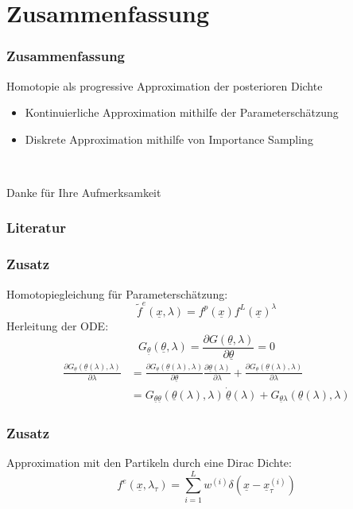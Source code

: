\documentclass[18pt]{beamer}
\begin{document}
\section{Zusammenfassung}
\begin{frame}
    \frametitle{Zusammenfassung}
    Homotopie als progressive Approximation der posterioren Dichte
    \begin{itemize}
        \item Kontinuierliche Approximation mithilfe der Parameterschätzung
        \item Diskrete Approximation mithilfe von Importance Sampling
    \end{itemize}
\end{frame}

\begin{frame}{~}
	\begin{center}
		\huge{Danke für Ihre Aufmerksamkeit}
	\end{center}
\end{frame}

\begin{frame}
    \frametitle{Literatur}
    
    
\end{frame}

\begin{frame}
    \frametitle{Zusatz}
    Homotopiegleichung für Parameterschätzung:
    \begin{equation}
        \tilde{f}^{e}(\underline{x},\lambda) = f^p(\underline{x})f^L(\underline{x})^{\lambda}
    \end{equation}
    Herleitung der ODE:
    \begin{equation}
        G_{\underline{\theta}}(\underline{\theta}, \lambda) = \frac{\partial G(\underline{\theta}, \lambda)}{\partial \underline{\theta}} = 0 
    \end{equation}
    \begin{equation}
        \begin{split}
            \frac{\partial G_{\underline{\theta}}(\underline{\theta}(\lambda),\lambda)}{\partial \lambda} &= \frac{\partial G_{\underline{\theta}}(\underline{\theta}(\lambda),\lambda)}{\partial \underline{\theta}} \frac{\partial \underline{\theta}(\lambda)}{\partial \lambda} + \frac{\partial G_{\underline{\theta}}(\underline{\theta}(\lambda),\lambda)}{\partial \lambda} \\
            &= G_{\underline{\theta}\underline{\theta}}(\underline{\theta}(\lambda),\lambda) \, \underline{\dot{\theta}}(\lambda) + G_{\underline{\theta}\lambda}(\underline{\theta}(\lambda),\lambda) 
        \end{split}
    \end{equation}
\end{frame}

\begin{frame}
    \frametitle{Zusatz}
    Approximation mit den Partikeln durch eine Dirac Dichte:
    \begin{equation}
        f^{e}(\underline{x}, \lambda_{\tau}) = \sum_{i=1}^{L}w^{(i)}\delta(\underline{x}-\underline{x}_{\tau}^{(i)})
    \end{equation}


\end{frame}
\end{document}
